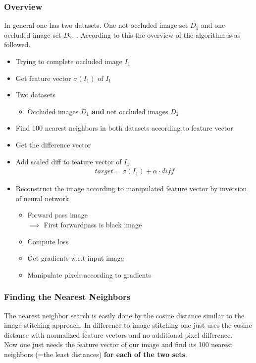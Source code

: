 \documentclass[
     11pt,         %
     a4paper,      %
     oneside,
     ]{article}
\begin{document}
\subsubsection{Overview}
In general one has two datasets. One not occluded image set $D_1$ and one occluded image set $D_2$.
. According to this the overview of the algorithm is as followed. \cite{DFI}
\begin{itemize}
	\item Trying to complete occluded image $I_1$
	\item Get feature vector $\sigma (I_1)$ of $I_1$
	\item Two datasets
    \begin{itemize}
        \item Occluded images $D_1$ \textbf{and} not occluded images $D_2$
    \end{itemize}
    \item Find 100 nearest neighbors in both datasets according to feature vector
    \item Get the difference vector
    \item Add scaled diff to feature vector of $I_1$
    \begin{align*}
    	target = \sigma (I_1) + \alpha \cdot diff
    \end{align*}
    \item Reconstruct the image according to manipulated feature vector by inversion of neural network
    \begin{itemize}
        \item Forward pass image \\
        $\implies$ First forwardpass is black image
        \item Compute loss
        \item Get gradients w.r.t input image
        \item Manipulate pixels according to gradients
    \end{itemize}
\end{itemize}



\subsubsection{Finding the Nearest Neighbors}
The nearest neighbor search is easily done by the cosine distance similar to the image stitching approach.
In difference to image stitching one just uses the cosine distance with normalized feature vectors and no additional pixel difference.\\
Now one just needs the feature vector of our image and find its 100 nearest neighbors (=the least distances) \textbf{for each of the two sets}.\cite{DFI}
\end{document}
